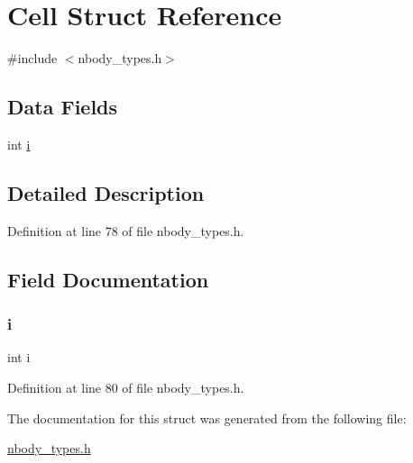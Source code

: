 \hypertarget{struct_cell}{}\section{Cell Struct Reference}
\label{struct_cell}


{\ttfamily \#include $<$nbody\+\_\+types.\+h$>$}

\subsection*{Data Fields}
\begin{DoxyCompactItemize}
\item 
int \hyperlink{struct_cell_acb559820d9ca11295b4500f179ef6392}{i}
\end{DoxyCompactItemize}


\subsection{Detailed Description}


Definition at line 78 of file nbody\+\_\+types.\+h.



\subsection{Field Documentation}
\hypertarget{struct_cell_acb559820d9ca11295b4500f179ef6392}{}\label{struct_cell_acb559820d9ca11295b4500f179ef6392} 
\subsubsection{\texorpdfstring{i}{i}}
{\footnotesize\ttfamily int i}



Definition at line 80 of file nbody\+\_\+types.\+h.



The documentation for this struct was generated from the following file\+:\begin{DoxyCompactItemize}
\item 
\hyperlink{nbody__types_8h}{nbody\+\_\+types.\+h}\end{DoxyCompactItemize}
